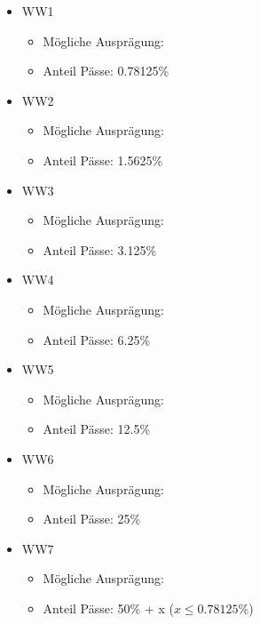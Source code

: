 \begin{NFT-Prop}
\begin{itemize}
    \item WW1
    \begin{itemize}
    	\item Mögliche Ausprägung:  
    	\item Anteil Pässe: 0.78125\%
    \end{itemize}
    \item WW2
    \begin{itemize}
    	\item Mögliche Ausprägung:  
    	\item Anteil Pässe: 1.5625\%
    \end{itemize}
    \item WW3
    \begin{itemize}
    	\item Mögliche Ausprägung:  
    	\item Anteil Pässe: 3.125\%
    \end{itemize}
    \item WW4
    \begin{itemize}
    	\item Mögliche Ausprägung:  
    	\item Anteil Pässe: 6.25\%
    \end{itemize}
    \item WW5
    \begin{itemize}
    	\item Mögliche Ausprägung:  
    	\item Anteil Pässe: 12.5\%
    \end{itemize}
    \item WW6
    \begin{itemize}
    	\item Mögliche Ausprägung:  
    	\item Anteil Pässe: 25\%
    \end{itemize}
    \item WW7
    \begin{itemize}
    	\item Mögliche Ausprägung:  
    	\item Anteil Pässe: 50\% + x ($x \leq 0.78125\%$)
    \end{itemize}
\end{itemize}

\end{NFT-Prop}

